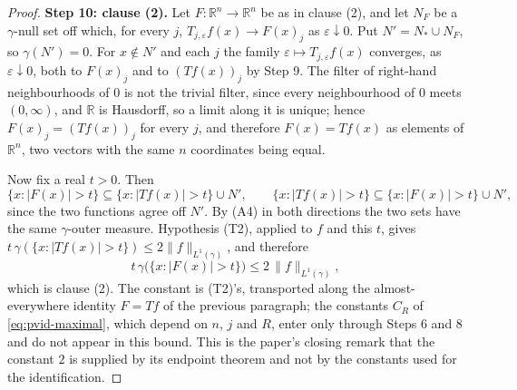 \begin{proof}
\medskip
\noindent\textbf{Step 10: clause (2).}
Let $F : \mathbb{R}^n \to \mathbb{R}^n$ be as in clause (2), and let $N_F$ be a
$\gamma$-null set off which, for every $j$,
$T_{j,\varepsilon}f(x) \to F(x)_j$ as $\varepsilon\downarrow0$.  Put
$N' = N_* \cup N_F$, so $\gamma(N') = 0$.  For $x \notin N'$ and each $j$ the
family $\varepsilon \mapsto T_{j,\varepsilon}f(x)$ converges, as
$\varepsilon \downarrow 0$, both to $F(x)_j$ and to $(Tf(x))_j$ by Step 9.
The filter of right-hand neighbourhoods of $0$ is not the trivial filter, since
every neighbourhood of $0$ meets $(0,\infty)$, and $\mathbb{R}$ is Hausdorff,
so a limit along it is unique; hence $F(x)_j = (Tf(x))_j$ for every $j$, and
therefore $F(x) = Tf(x)$ as elements of $\mathbb{R}^n$, two vectors with the
same $n$ coordinates being equal.

Now fix a real $t > 0$.  Then
\[
  \{x : |F(x)| > t\} \subseteq \{x : |Tf(x)| > t\} \cup N' ,
  \qquad
  \{x : |Tf(x)| > t\} \subseteq \{x : |F(x)| > t\} \cup N' ,
\]
since the two functions agree off $N'$.  By (A4) in both directions the two
sets have the same $\gamma$-outer measure.  Hypothesis (T2), applied to $f$ and
this $t$, gives $t\,\gamma(\{x : |Tf(x)| > t\}) \leq 2\|f\|_{L^1(\gamma)}$, and
therefore
\[
  t\,\gamma\bigl(\{x : |F(x)| > t\}\bigr) \leq 2\,\|f\|_{L^1(\gamma)} ,
\]
which is clause (2).  The constant is (T2)'s, transported along the
almost-everywhere identity $F = Tf$ of the previous paragraph; the constants
$C_R$ of \eqref{eq:pvid-maximal}, which depend on $n$, $j$ and $R$, enter only
through Steps 6 and 8 and do not appear in this bound.  This is the paper's
closing remark that the constant $2$ is supplied by its endpoint theorem and
not by the constants used for the identification.
%

\end{proof}

